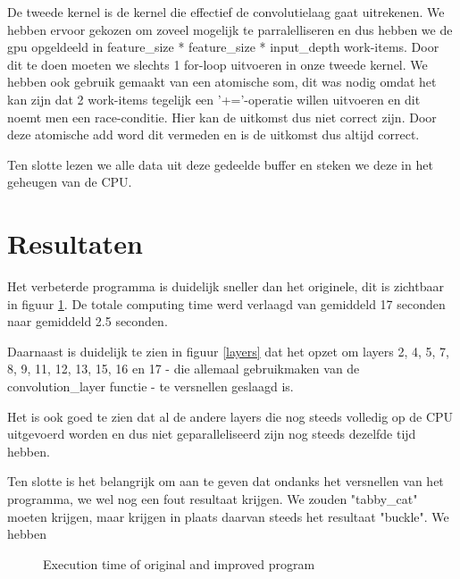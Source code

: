 \documentclass[a4paper, 12pt, one column]{article}
\begin{document}
\noindent
De tweede kernel is de kernel die effectief de convolutielaag gaat uitrekenen. We hebben ervoor gekozen om zoveel mogelijk te 
parralelliseren en dus hebben we de gpu opgeldeeld in feature_size * feature_size * input_depth work-items.
Door dit te doen moeten we slechts 1 for-loop uitvoeren in onze tweede kernel. 
We hebben ook gebruik gemaakt van een atomische som, dit was nodig omdat het kan zijn dat 2 work-items tegelijk een '+='-operatie
willen uitvoeren en dit noemt men een race-conditie. Hier kan de uitkomst dus niet correct zijn. Door deze atomische add word dit 
vermeden en is de uitkomst dus altijd correct.

\noindent
Ten slotte lezen we alle data uit deze gedeelde buffer en steken we deze in het geheugen van de CPU.

\section{Resultaten}
Het verbeterde programma is duidelijk sneller dan het originele, dit is zichtbaar in figuur \ref{general}. De totale computing time
werd verlaagd van gemiddeld 17 seconden naar gemiddeld 2.5 seconden.

\noindent
Daarnaast is duidelijk te zien in figuur \ref{layers} dat het opzet om layers 2, 4, 5, 7, 8, 9, 11, 12, 13, 15, 16 en 17 - die allemaal
gebruikmaken van de convolution\_layer functie - te versnellen geslaagd is.

\noindent
Het is ook goed te zien dat al de andere layers die nog steeds volledig op de CPU uitgevoerd worden en dus niet geparalleliseerd zijn
nog steeds dezelfde tijd hebben.

\noindent
Ten slotte is het belangrijk om aan te geven dat ondanks het versnellen van het programma, we wel nog een fout resultaat krijgen.
We zouden "tabby\_cat" moeten krijgen, maar krijgen in plaats daarvan steeds het resultaat "buckle". We hebben 

\begin{figure}
  \centering
  \caption{Execution time of original and improved program}
  \label{general}
\end{figure}
\end{document}
